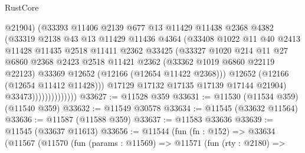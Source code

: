 \begin{lexlean}{RustCore}
\begin{coremodule}
                                @21904)
                              (@33393
                                @11406
                                @2139
                                @677
                                @13
                                @11429
                                @11438
                                @2368
                                @4382
                                (@33319
                                  @2138
                                  @43
                                  @13
                                  @11429
                                  @11436
                                  @4364
                                  (@33408
                                    @1022
                                    @11
                                    @40
                                    @2413
                                    @11428
                                    @11435
                                    @2518
                                    @11411
                                    @2362
                                    @33425
                                    (@33327
                                      @1020
                                      @214
                                      @11
                                      @27
                                      @6860
                                      @2368
                                      @2423
                                      @2518
                                      @11421
                                      @2362
                                      (@33362 @1019 @6860 @22119 @22123)
                                      @33369
                                      @12652
                                      (@12166 (@12654 @11422 @2368)))
                                    @12652
                                    (@12166 (@12654 @11412 @11428)))
                                  @17129
                                  @17132
                                  @17135
                                  @17139
                                  @17144
                                  @21904)
                                @33473))))))))))))))
@33627 := @11528 @359
@33631 := @11530 (@11534 @359) (@11540 @359)
@33632 := @11549 @30578
@33634 := @11545 (@33632 @11564)
@33636 := @11587 (@11588 @359)
@33637 := @11583 @33636
@33639 := @11545 (@33637 @11613)
@33656 := @11544
    (fun (fn : @152) =>
    @33634
      (@11567
        (@11570
          (fun (params : @11569) =>
          @11571
            (fun (rty : @2180) =>

\end{coremodule}
\end{lexlean}
